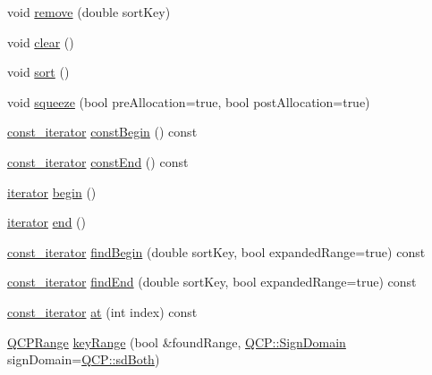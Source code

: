 \begin{DoxyCompactItemize}
\item 
void \mbox{\hyperlink{class_q_c_p_data_container_a2dbded7f0732bacf9db48fdfbbb620bc}{remove}} (double sort\+Key)
\item 
void \mbox{\hyperlink{class_q_c_p_data_container_a7e2b29736c6fd761649bda1a54ba967f}{clear}} ()
\item 
void \mbox{\hyperlink{class_q_c_p_data_container_a75da92e33063b63d6da5014683591d45}{sort}} ()
\item 
void \mbox{\hyperlink{class_q_c_p_data_container_a82fcc511def22287fc62579d0706387c}{squeeze}} (bool pre\+Allocation=true, bool post\+Allocation=true)
\item 
\mbox{\hyperlink{class_q_c_p_data_container_ae40a91f5cb0bcac61d727427449b7d15}{const\+\_\+iterator}} \mbox{\hyperlink{class_q_c_p_data_container_a49d7622999e2de67fa2331626a3159aa}{const\+Begin}} () const
\item 
\mbox{\hyperlink{class_q_c_p_data_container_ae40a91f5cb0bcac61d727427449b7d15}{const\+\_\+iterator}} \mbox{\hyperlink{class_q_c_p_data_container_aa7f7cf239b85b1a28de3d675cc5b3da1}{const\+End}} () const
\item 
\mbox{\hyperlink{class_q_c_p_data_container_a1bb453c3ae37d1ee5268878acb3a9d29}{iterator}} \mbox{\hyperlink{class_q_c_p_data_container_a80032518413ab8f418f7c81182fd06cb}{begin}} ()
\item 
\mbox{\hyperlink{class_q_c_p_data_container_a1bb453c3ae37d1ee5268878acb3a9d29}{iterator}} \mbox{\hyperlink{class_q_c_p_data_container_acf66dfad83fe041380f5e0491e7676f2}{end}} ()
\item 
\mbox{\hyperlink{class_q_c_p_data_container_ae40a91f5cb0bcac61d727427449b7d15}{const\+\_\+iterator}} \mbox{\hyperlink{class_q_c_p_data_container_a2ad8a5399072d99a242d3a6d2d7e278a}{find\+Begin}} (double sort\+Key, bool expanded\+Range=true) const
\item 
\mbox{\hyperlink{class_q_c_p_data_container_ae40a91f5cb0bcac61d727427449b7d15}{const\+\_\+iterator}} \mbox{\hyperlink{class_q_c_p_data_container_afb8b8f23cc2b7234a793a25ce79fe48f}{find\+End}} (double sort\+Key, bool expanded\+Range=true) const
\item 
\mbox{\hyperlink{class_q_c_p_data_container_ae40a91f5cb0bcac61d727427449b7d15}{const\+\_\+iterator}} \mbox{\hyperlink{class_q_c_p_data_container_ae90c7457a052b223539906e6bddc0a92}{at}} (int index) const
\item 
\mbox{\hyperlink{class_q_c_p_range}{Q\+C\+P\+Range}} \mbox{\hyperlink{class_q_c_p_data_container_aba6e1a93c21ccc56a432b4a02c9d0ed2}{key\+Range}} (bool \&found\+Range, \mbox{\hyperlink{namespace_q_c_p_afd50e7cf431af385614987d8553ff8a9}{Q\+C\+P\+::\+Sign\+Domain}} sign\+Domain=\mbox{\hyperlink{namespace_q_c_p_afd50e7cf431af385614987d8553ff8a9aa38352ef02d51ddfa4399d9551566e24}{Q\+C\+P\+::sd\+Both}})

\end{DoxyCompactItemize}
